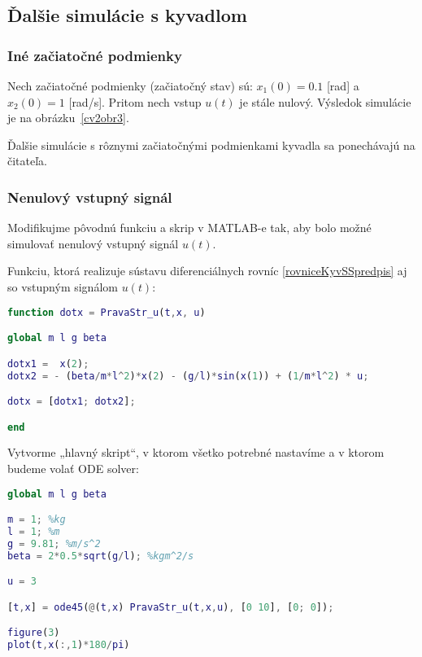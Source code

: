 \documentclass[a4paper, 10pt, ]{article}
\begin{document}
\subsection{Ďalšie simulácie s kyvadlom}

\subsubsection{Iné začiatočné podmienky}

Nech začiatočné podmienky (začiatočný stav) sú: $x_1(0) = 0.1$ [rad] a~$x_2(0) = 1$ [rad/s]. Pritom nech vstup $u(t)$ je stále nulový. Výsledok simulácie je na obrázku~\ref{cv2obr3}.
\begin{center}


    \vspace{-3mm}

	\label{cv2obr3}


\end{center}

\noindent
Ďalšie simulácie s rôznymi začiatočnými podmienkami kyvadla sa ponechávajú na čitateľa.





\subsubsection{Nenulový vstupný signál}

Modifikujme pôvodnú funkciu a skrip v MATLAB-e tak, aby bolo možné simulovať nenulový vstupný signál $u(t)$.

Funkciu, ktorá realizuje sústavu diferenciálnych rovníc \eqref{rovniceKyvSSpredpis} aj so vstupným signálom $u(t)$:
\begin{lstlisting}[language=Matlab, title=Celý súbor PravaStr\_u.m]
function dotx = PravaStr_u(t,x, u)

global m l g beta

dotx1 =  x(2);
dotx2 = - (beta/m*l^2)*x(2) - (g/l)*sin(x(1)) + (1/m*l^2) * u;

dotx = [dotx1; dotx2];

end
\end{lstlisting}

Vytvorme „hlavný skript“, v ktorom všetko potrebné nastavíme a v ktorom budeme volať ODE solver:
\begin{lstlisting}[language=Matlab, title=Súbor hlSkript\_u.m]
global m l g beta

m = 1; %kg
l = 1; %m
g = 9.81; %m/s^2
beta = 2*0.5*sqrt(g/l); %kgm^2/s

u = 3

[t,x] = ode45(@(t,x) PravaStr_u(t,x,u), [0 10], [0; 0]);

figure(3)
plot(t,x(:,1)*180/pi)
\end{lstlisting}
\end{document}
